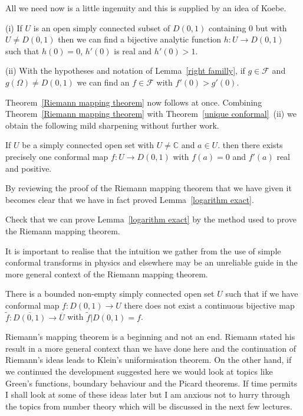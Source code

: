 All we need now is a little ingenuity and this is
supplied by an idea of Koebe.
\begin{lemma}  (i) If $U$ is an open simply connected
subset of $D(0,1)$ containing $0$ but with $U\neq D(0,1)$
then we can find a bijective analytic function
$h:U\rightarrow D(0,1)$ such that $h(0)=0$, $h'(0)$
is real and $h'(0)>1$.

(ii) With the hypotheses and notation
of Lemma~\ref{right familly}, if $g\in\mathcal{F}$
and $g(\Omega)\neq D(0,1)$ we can find an $f\in\mathcal{F}$
with $f'(0)>g'(0)$.
\end{lemma}

Theorem~\ref{Riemann mapping theorem} now follows at
once. Combining Theorem~\ref{Riemann mapping theorem}
with Theorem~\ref{unique conformal}~(ii) we obtain
the following mild sharpening
without further work.
\begin{theorem} If $U$ be a simply connected open set 
with $U\neq{\mathbb C}$ and $a\in U$.
then there exists precisely one conformal map
$f:U\rightarrow D(0,1)$ with $f(a)=0$ and $f'(a)$ real
and positive.
\end{theorem}

By reviewing the proof of the Riemann mapping theorem
that we have given it  becomes clear that we have
in fact proved Lemma~\ref{logarithm exact}.
\begin{exercise} Check that we can prove
Lemma~\ref{logarithm exact} by the method used to prove
the Riemann mapping theorem.
\end{exercise}


It is important to realise that the intuition
we gather from the use of simple conformal transforms
in physics and elsewhere may be an unreliable guide
in the more general context of the Riemann mapping theorem.
\begin{example}\label{bad boundary}
There is a bounded non-empty
simply connected open set $U$ such that if
we have conformal map $f:D(0,1)\rightarrow U$
there does not exist a continuous bijective map
$\tilde{f}:\overline{D(0,1)}\rightarrow\overline{U}$
with $\tilde{f}|D(0,1)=f$.
\end{example}

Riemann's mapping theorem is a beginning and not an
end. Riemann stated his result in a more general context
than we have done here and the continuation of
Riemann's ideas leads to Klein's uniformisation
theorem. On the other hand, if we continued the
development suggested here we would look at topics
like
Green's functions, boundary behaviour and the Picard
theorems. If time permits I shall look at some
of these ideas later but I am anxious not to hurry
through the topics from number theory which
will be discussed in the next few lectures.
